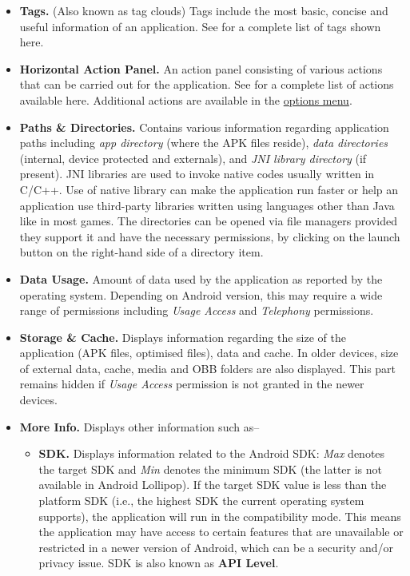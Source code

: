\begin{itemize}
    \item \textbf{Tags.} (Also known as tag clouds) Tags include the most basic, concise and useful information of an
    application. See  for a complete list of tags shown here.

    \item \textbf{Horizontal Action Panel.} An action panel consisting of various actions that can be carried out for
    the application. See  for a complete list of actions available here.
    Additional actions are available in the \hyperref[subsubsec:app-info-options-menu]{options menu}.

    \item \textbf{Paths \& Directories.} Contains various information regarding application paths
    including \textit{app directory} (where the APK files reside), \textit{data directories}
    (internal, device protected and externals), and \textit{JNI library directory} (if present).
    JNI libraries are used to invoke native codes usually written in C/C++. Use of native library
    can make the application run faster or help an application use third-party libraries written
    using languages other than Java like in most games. The directories can be opened via file
    managers provided they support it and have the necessary permissions, by clicking on the launch
    button on the right-hand side of a directory item.

    \item \textbf{Data Usage.} Amount of data used by the application as reported by the operating system. Depending on
    Android version, this may require a wide range of permissions including \textit{Usage Access} and \textit{Telephony}
    permissions.

    \item \textbf{Storage \& Cache.} Displays information regarding the size of the application (APK files, optimised
    files), data and cache. In older devices, size of external data, cache, media and OBB folders are also displayed.
    This part remains hidden if \textit{Usage Access} permission is not granted in the newer devices.

    \item \textbf{More Info.} Displays other information such as--
    \begin{itemize}
        \item \textbf{SDK.} Displays information related to the Android SDK: \textit{Max} denotes
        the target SDK and \textit{Min} denotes the minimum SDK (the latter is not available in
        Android Lollipop). If the target SDK value is less than the platform SDK (i.e., the highest
        SDK the current operating system supports), the application will run in the compatibility
        mode. This means the application may have access to certain features that are unavailable or
        restricted in a newer version of Android, which can be a security and/or privacy issue. SDK
        is also known as \textbf{API Level}.\\


\end{itemize}
\end{itemize}
